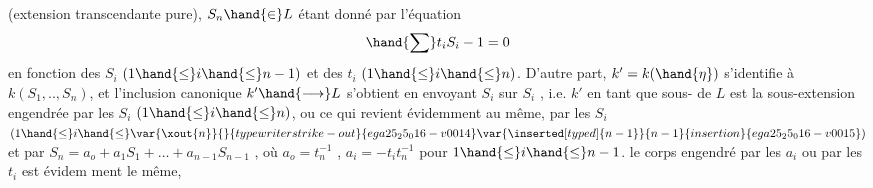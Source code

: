 (extension transcendante pure), $S_n\hand{\in} L$ étant donné par l'équation
\[ \hand{\sum} t_iS_i - 1 = 0 \]
en fonction des $S_i$ $(1\hand{\leq} i\hand{\leq} n-1)$ et des $t_i$ $(1\hand{\leq} i\hand{\leq} n)$. D'autre part,
$k' = k(\hand{\eta})$ s'identifie à $k(S_1,..,S_n)$, et l'inclusion canonique
$k'\hand{\longrightarrow} L$ s'obtient en envoyant $S_i$ sur $S_i$ , i.e. $k'$ en tant que sous-%
 de $L$ est la sous-extension engendrée par les $S_i$ $(1\hand{\leq} i\hand{\leq} n)$, ou
ce qui revient évidemment au même, par les $S_i$ $(1\hand{\leq} i\hand{\leq} \var{\xout{n}}{}{typewriter strike-out}{ega25_25_016-v0014}\var{\inserted[typed]{n-1}}{n-1}{insertion}{ega25_25_016-v0015})$ et par
$S_n = a_o + a_1S_1 + \ldots + a_{n-1}S_{n-1}$ , où $a_o = t_n^{-1}$ , $a_i =-t_it_n^{-1}$ pour
$1\hand{\leq} i\hand{\leq} n-1$.  le corps engendré par les $a_i$ ou par les $t_i$ est évidem
ment le même, 

